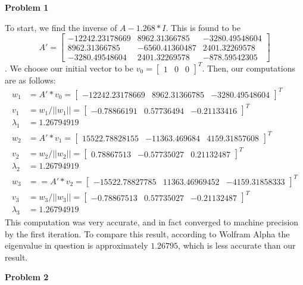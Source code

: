 \documentclass{article}
\newcommand{\Problem}[1]{\textbf{\large Problem #1}}
\begin{document}
\Problem{1}

To start, we find the inverse of $A - 1.268 * I$. 
This is found to be 
$$A' = \begin{bmatrix}
 -12242.23178669 & 8962.31366785 & -3280.49548604\\
 8962.31366785 & -6560.41360487 & 2401.32269578\\
 -3280.49548604 & 2401.32269578 & -878.59542305	
 \end{bmatrix}$$.
We choose our initial vector to be $v_0 = \begin{bmatrix}
 1 & 0 & 0	
 \end{bmatrix}^T$. 
Then, our computations are as follows:
\begin{align*}
w_1 &= A' * v_0 = \begin{bmatrix} -12242.23178669 & 8962.31366785 & -3280.49548604 \end{bmatrix}^T\\
v_1 &= w_1 / ||w_1|| = \begin{bmatrix} -0.78866191 & 0.57736494 & -0.21133416 \end{bmatrix}^T \\
\lambda_1 &= 1.26794919 \\
w_2 &= A' * v_1 = \begin{bmatrix} 15522.78828155 & -11363.469684 & 4159.31857608 \end{bmatrix}^T\\
v_2 &= w_2  / ||w_2|| = \begin{bmatrix} 0.78867513 & -0.57735027 & 0.21132487 \end{bmatrix}^T\\
\lambda_2 &= 1.26794919 \\
w_3 &= = A' * v_2 = \begin{bmatrix} -15522.78827785 & 11363.46969452 & -4159.31858333 \end{bmatrix}^T\\
v_3 &= w_3 / ||w_3|| = \begin{bmatrix} -0.78867513 & 0.57735027 & -0.21132487\end{bmatrix}^T\\
\lambda_3 &= 1.26794919
\end{align*}
This computation was very accurate, and in fact converged to machine precision by the first iteration. 
To compare this result, according to Wolfram Alpha the eigenvalue in question is approximately $1.26795$, which is less accurate than our result. 

\Problem{2}
\end{document}
